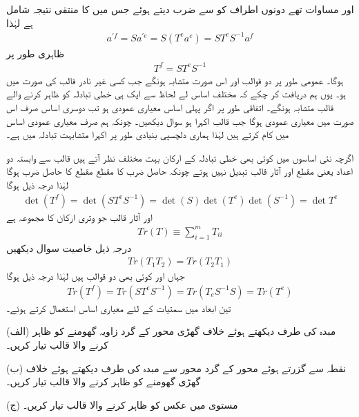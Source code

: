 اور مساوات  تھے دونوں اطراف کو  سے ضرب دیتے ہوئے جس میں  کا منتقی نتیجہ شامل ہے لہٰذا
\begin{align*}
	a^{'f} = Sa^{'e} = S(T^ea^e) = ST^eS^{-1}a^f
\end{align*}
ظاہری طور پر
\begin{align}
	T^f = ST^eS^{-1}
\end{align}
ہوگا۔ عمومی طور پر دو قوالب  اور  اس صورت متشابہ ہونگے جب کسی غیر نادر قالب  کی صورت میں  ہو۔ یوں ہم دریافت کر چکے کہ مختلف اساس لے لحاظ سے ایک ہی خطی تبادلہ کو ظاہر کرنے والے قالب متشابہ ہونگے۔ اتفاقی طور پر اگر پہلی اساس معیاری عمودی ہو تب دوسری اساس صرف اس صورت میں معیاری عمودی ہوگا جب قالب  اکہرا ہو سوال  دیکھیں۔ چونکہ ہم صرف معیاری عمودی اساس میں کام کرتے ہیں لہٰذا ہماری دلچسپی بنیادی طور پر اکہرا متشابہت تبادلہ میں ہے۔

اگرچہ نئی اساسوں میں کوئی بھی خطی تبادلہ کے ارکان بہت مختلف نظر آتے ہیں قالب سے وابستہ دو اعداد یعنی مقطع اور آثار قالب تبدیل نہیں ہوتے چونکہ حاصل ضرب کا مقطع مقطع کا حاصل ضرب ہوگا لہٰذا درجہ ذیل ہوگا 
\begin{align}
	\det(T^f) = \det(ST^eS^{-1}) = \det(S)\det(T^e)\det(S^{-1}) = \det T^e
\end{align}
اور آثار قالب جو وتری ارکان کا مجموعہ ہے 
\begin{align}
	Tr(T)\equiv\sum_{i=1}^{m}T_{ii}
\end{align}
درجہ ذیل خاصیت سوال  دیکھیں
\begin{align}
	Tr(T_1T_2) = Tr(T_2T_1)
\end{align}
جہاں  اور  کوئی بھی دو قوالب ہیں لہٰذا درجہ ذیل ہوگا
\begin{align}
	Tr(T^f) = Tr(ST^eS^{-1}) = Tr(T_eS^{-1}S) = Tr(T^e)
\end{align}
تین ابعاد میں سمتیات کے لئے معیاری اساس  استعمال کرتے ہوئے۔

(الف) مبدہ کی طرف دیکھتے ہوئے خلاف گھڑی  محور کے گرد زاویہ  گھومنے کو ظاہر کرنے والا قالب تیار کریں۔

(ب) نقطہ  سے گزرتے ہوئے محور کے گرد محور سے مبدہ کی طرف دیکھتے ہوئے خلاف گھڑی  گھومنے کو ظاہر کرنے والا قالب تیار کریں۔

(ج) مستوی  میں عکس کو ظاہر کرنے والا قالب تیار کریں۔

